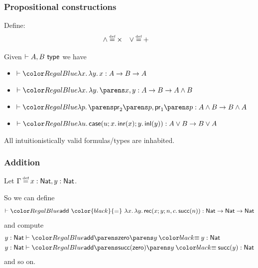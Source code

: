 \documentclass[handout]{beamer} %
\begin{document}
\begin{frame}
  \frametitle{Propositional constructions}
  
  \begin{center}
  \end{center}
  Define:
  \begin{align*}
    \land &\defeq \times
    &
    \lor &\defeq +
  \end{align*}
  
  \medskip
  
  Given $\IsTy[]{A, B}[]$ we have
  
  \begin{itemize}
    \item $\IsTm[]{\Lam{x}{\Lam{y}{x}}}{A \to B \to A}$
    \item $\IsTm[]{\Lam{x}{\Lam{y}{\Pair{x}{y}}}}{A \to B \to A \land B}$
    \item $\IsTm[]{\Lam{p}{\Pair{\Proj[2]{p}}{\Proj[1]{p}}}}{A \land B \to B \land A}$
    \item $\IsTm[]{\Lam{u}{\Case{u}{x}{\Inr{x}}{y}{\Inl{y}}}}{A \lor B \to B \lor A}$
  \end{itemize}
  
  \begin{theorem}
    All intuitionistically valid formulas/types are inhabited.
  \end{theorem}
\end{frame}

\begin{frame}
  \frametitle{Addition}
  
  Let $\Gamma \defeq x : \Nat, y : \Nat$.
  \begin{mathpar}
    \small
  \end{mathpar}
  
  So we can define
  \[
    \IsTm[]{\textsf{add}\ {\color{black}{=}}\
      \Lam{x}{\Lam{y}{
        \NatRec{x}{y}{n}{c}{\Succ{n}}
      }}}{\Nat \to \Nat \to \Nat}
  \]
  and compute
  \begin{align*}
    &\IsTm[y : \Nat]{
      \App{\App{\textsf{add}}{\Zero}}{y}
        \deq
      y
    }{\Nat}
    \\
    &\IsTm[y : \Nat]{
      \App{\App{\textsf{add}}{\Succ{\Zero}}}{y}
        \deq
      \Succ{y}
    }{\Nat}
  \end{align*}
  and so on.
\end{frame}
\end{document}
